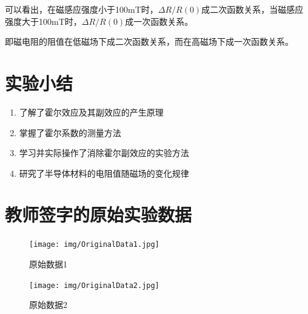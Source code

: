 \documentclass[UTF8]{ctexart}
\begin{document}
可以看出，在磁感应强度小于100mT时，$\Delta R/R(0)$成二次函数关系，当磁感应强度大于100mT时，$\Delta R/R(0)$成一次函数关系。

即磁电阻的阻值在低磁场下成二次函数关系，而在高磁场下成一次函数关系。

\section{实验小结}

\begin{enumerate}
    \item 了解了霍尔效应及其副效应的产生原理
    \item 掌握了霍尔系数的测量方法
    \item 学习并实际操作了消除霍尔副效应的实验方法
    \item 研究了半导体材料的电阻值随磁场的变化规律
\end{enumerate}

\newpage
\section{教师签字的原始实验数据}
    \begin{center}
        \begin{figure}[H] %
            \centering %
            \texttt{[image: img/OriginalData1.jpg]} %
            \caption{原始数据1} %
            \label{原始数据-1} %
        \end{figure}
        \begin{figure}[H] %
            \centering %
            \texttt{[image: img/OriginalData2.jpg]} %
            \caption{原始数据2} %
            \label{原始数据-2} %
        \end{figure}
    \end{center}
\end{document}
